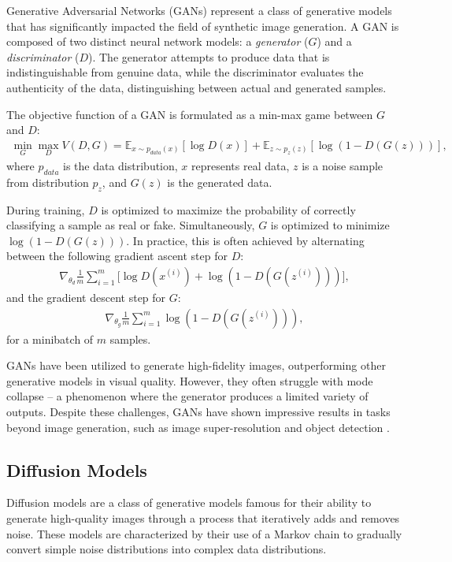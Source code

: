 \documentclass[11pt,a4paper,oneside]{report}
\begin{document}
Generative Adversarial Networks (GANs) represent a class of generative models that has significantly impacted the field of synthetic image generation. A GAN is composed of two distinct neural network models: a \textit{generator} ($G$) and a \textit{discriminator} ($D$). The generator attempts to produce data that is indistinguishable from genuine data, while the discriminator evaluates the authenticity of the data, distinguishing between actual and generated samples.

The objective function of a GAN is formulated as a min-max game between $G$ and $D$:
\begin{align}
\min_{G} \max_{D} V(D, G) = \mathbb{E}_{x\sim p_{data}(x)}[\log D(x)] + \mathbb{E}_{z\sim p_{z}(z)}[\log (1 - D(G(z)))],
\end{align}
where $p_{data}$ is the data distribution, $x$ represents real data, $z$ is a noise sample from distribution $p_z$, and $G(z)$ is the generated data.

During training, $D$ is optimized to maximize the probability of correctly classifying a sample as real or fake. Simultaneously, $G$ is optimized to minimize $\log(1 - D(G(z)))$. In practice, this is often achieved by alternating between the following gradient ascent step for $D$:
\begin{align}
\nabla_{\theta_d} \frac{1}{m} \sum_{i=1}^{m} \Big[ \log D(x^{(i)}) + \log (1 - D(G(z^{(i)}))) \Big],
\end{align}
and the gradient descent step for $G$:
\begin{align}
\nabla_{\theta_g} \frac{1}{m} \sum_{i=1}^{m} \log (1 - D(G(z^{(i)}))),
\end{align}
for a minibatch of $m$ samples.

GANs have been utilized to generate high-fidelity images, outperforming other generative models in visual quality. However, they often struggle with mode collapse -- a phenomenon where the generator produces a limited variety of outputs. Despite these challenges, GANs have shown impressive results in tasks beyond image generation, such as image super-resolution \cite{denton2015deep}and object detection \cite{goodfellow2014generative}.

\subsection{Diffusion Models}

Diffusion models \cite{sohl2015deep, ho2020denoising} are a class of generative models famous for their ability to generate high-quality images through a process that iteratively adds and removes noise. These models are characterized by their use of a Markov chain to gradually convert simple noise distributions into complex data distributions.
\end{document}
